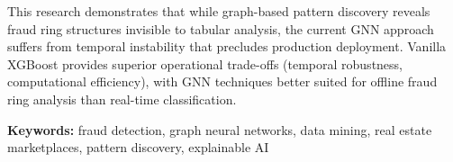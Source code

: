 \documentclass[11pt,a4paper]{report}
\let\oldabstract\abstract
\let\endoldabstract\endabstract
\renewenvironment{abstract}
  {\oldabstract\onehalfspacing\setlength{\parindent}{0pt}\setlength{\parskip}{0.6em}\rmfamily\fontsize{11}{13.2}\selectfont}
  {\endoldabstract}
\begin{document}
\begin{abstract}
This research demonstrates that while graph-based pattern discovery reveals fraud ring structures invisible to tabular analysis, the current GNN approach suffers from temporal instability that precludes production deployment. Vanilla XGBoost provides superior operational trade-offs (temporal robustness, computational efficiency), with GNN techniques better suited for offline fraud ring analysis than real-time classification.

\textbf{Keywords:} fraud detection, graph neural networks, data mining, real estate marketplaces, pattern discovery, explainable AI
\end{abstract}

\let\oldcleardoublepage\cleardoublepage
\renewcommand{\cleardoublepage}{}

\tableofcontents
\listoffigures
\listoftables
\listofalgorithms


\let\cleardoublepage\oldcleardoublepage








\printbibliography[title={References}]

\appendix

\end{document}
